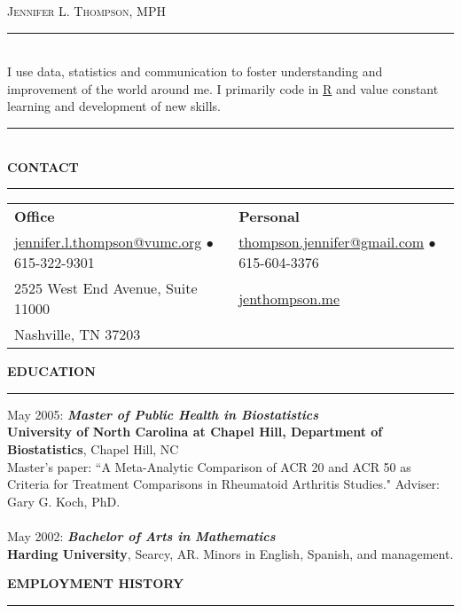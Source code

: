 \documentclass[5pt]{article}
\begin{document}
\begin{center}
\textsc{\Huge{Jennifer L. Thompson, MPH}}
\end{center}
\rule[5pt]{\linewidth}{0.25pt}\\
\noindent I use data, statistics and communication to foster understanding and improvement of the world around me. I primarily code in \href{http://www.r-project.org}{R} and value constant learning and development of new skills.\\
\rule[5pt]{\linewidth}{0.25pt}\\

\noindent \textbf{CONTACT}\\
\rule[5pt]{\linewidth}{1.0pt}

\begin{tabular}{ l l }
\textbf{Office} & \textbf{Personal} \\
\href{mailto:jennifer.l.thompson@vumc.org}{jennifer.l.thompson@vumc.org} $\bullet$ 615-322-9301 &
\href{mailto:thompson.jennifer@gmail.com}{thompson.jennifer@gmail.com} $\bullet$ 615-604-3376 \\
2525 West End Avenue, Suite 11000 &
\href{https://jenthompson.me}{jenthompson.me} \\
Nashville, TN 37203 & \\
\end{tabular}

\noindent \linebreak \linebreak \textbf{EDUCATION}\\
\rule[5pt]{\linewidth}{1.0pt}
\noindent May 2005: \textbf{\emph{Master of Public Health in Biostatistics}}\\
\noindent \textbf{University of North Carolina at Chapel Hill, Department of Biostatistics}, Chapel Hill, NC\\
\indent Master's paper: ``A Meta-Analytic Comparison of ACR 20 and ACR 50 as Criteria for Treatment
\indent Comparisons in Rheumatoid Arthritis Studies." Adviser: Gary G. Koch, PhD.
\\ \\
\noindent May 2002: \textbf{\emph{Bachelor of Arts in Mathematics}}\\
\textbf{Harding University}, Searcy, AR. Minors in English, Spanish, and management.

\noindent \linebreak \textbf{EMPLOYMENT HISTORY}\\
\rule[5pt]{\linewidth}{1.0pt}
\end{document}
